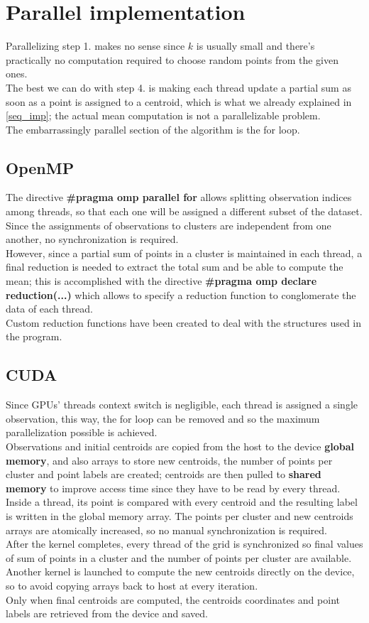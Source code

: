 \documentclass[10pt,twocolumn,letterpaper]{article}
\begin{document}
\section{Parallel implementation}
Parallelizing step 1. makes no sense since $k$ is usually small and there's practically no computation required to choose random points from the given ones.\\
The best we can do with step 4. is making each thread update a partial sum as soon as a point is assigned to a centroid, which is what we already explained in \cref{seq_imp}; the actual mean computation is not a parallelizable problem.\\
The embarrassingly parallel section of the algorithm is the for loop.
\subsection{OpenMP}
The directive \textbf{\#pragma omp parallel for} allows splitting observation indices among threads, so that each one will be assigned a different subset of the dataset.\\
Since the assignments of observations to clusters are independent from one another, no synchronization is required.\\
However, since a partial sum of points in a cluster is maintained in each thread, a final reduction is needed to extract the total sum and be able to compute the mean; this is accomplished with the directive \textbf{\#pragma omp declare reduction(...)} which allows to specify a reduction function to conglomerate the data of each thread.\\
Custom reduction functions have been created to deal with the structures used in the program.
\subsection{CUDA}
Since GPUs' threads context switch is negligible, each thread is assigned a single observation, this way, the for loop can be removed and so the maximum parallelization possible is achieved.\\
Observations and initial centroids are copied from the host to the device \textbf{global memory}, and also arrays to store new centroids, the number of points per cluster and point labels are created; centroids are then pulled to \textbf{shared memory} to improve access time since they have to be read by every thread.\\
Inside a thread, its point is compared with every centroid and the resulting label is written in the global memory array. The points per cluster and new centroids arrays are atomically increased, so no manual synchronization is required.\\
After the kernel completes, every thread of the grid is synchronized so final values of sum of points in a cluster and the number of points per cluster are available.
Another kernel is launched to compute the new centroids directly on the device, so to avoid copying arrays back to host at every iteration.\\
Only when final centroids are computed, the centroids coordinates and point labels are retrieved from the device and saved.\\
\end{document}
